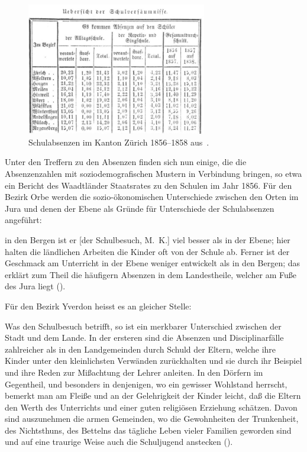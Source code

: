 \begin{figure}[!ht]
    \centering
    \includegraphics[width=0.7\textwidth]{./Figures/syn_001_1858_000_22_60_e105_24.jpg}
    \caption{Schulabsenzen im Kanton Zürich 1856–1858 aus~\cite[24]{noauthor_jahresbericht_1858}.}
    \label{figure:5-9}
\end{figure}

Unter den Treffern zu den Absenzen finden sich nun einige, die die Absenzenzahlen mit soziodemografischen Mustern in Verbindung bringen, so etwa ein Bericht des Waadtländer Staatsrates zu den Schulen im Jahr 1856. Für den Bezirk Orbe werden die sozio-ökonomischen Unterschiede zwischen den Orten im Jura und denen der Ebene als Gründe für Unterschiede der Schulabsenzen angeführt: 

\begin{displayquote}
in den Bergen ist er [der Schulbesuch, M.~K.] viel besser als in der Ebene; hier halten die ländlichen Arbeiten die Kinder oft von der Schule ab. Ferner ist der Geschmack am Unterricht in der Ebene weniger entwickelt als in den Bergen; das erklärt zum Theil die häufigern Absenzen in dem Landestheile, welcher am Fuße des Jura liegt (\cite[287]{noauthor_mittheilungen_1858}).
\end{displayquote}

Für den Bezirk Yverdon heisst es an gleicher Stelle: 

\begin{displayquote}
Was den Schulbesuch betrifft, so ist ein merkbarer Unterschied zwischen der Stadt und dem Lande. In der ersteren sind die Absenzen und Disciplinarfälle zahlreicher als in den Landgemeinden durch Schuld der Eltern, welche ihre Kinder unter den kleinlichsten Verwänden zurückhalten und sie durch ihr Beispiel und ihre Reden zur Mißachtung der Lehrer anleiten. In den Dörfern im Gegentheil, und besonders in denjenigen, wo ein gewisser Wohlstand herrscht, bemerkt man am Fleiße und an der Gelehrigkeit der Kinder leicht, daß die Eltern den Werth des Unterrichts und einer guten religiösen Erziehung schätzen. Davon sind auszunehmen die armen Gemeinden, wo die Gewohnheiten der Trunkenheit, des Nichtsthuns, des Bettelns das tägliche Leben vieler Familien geworden sind und auf eine traurige Weise auch die Schuljugend anstecken (\cite[287]{noauthor_mittheilungen_1858}).
\end{displayquote}

